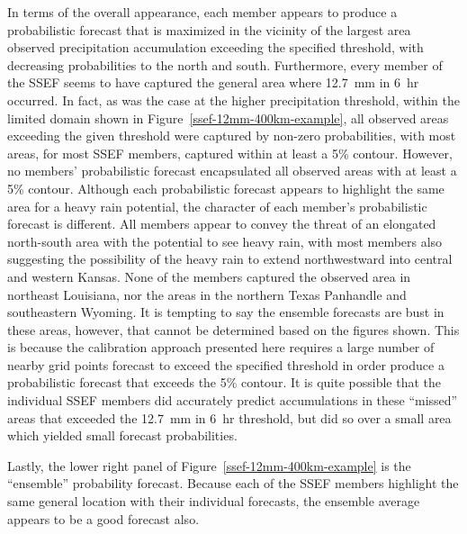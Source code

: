 In terms of the overall appearance, each member appears to produce a probabilistic forecast that is maximized in the vicinity of the largest area observed precipitation accumulation exceeding the specified threshold, with decreasing probabilities to the north and south.
Furthermore, every member of the SSEF seems to have captured the general area where \mbox{12.7 mm} in \mbox{6 hr} occurred.
In fact, as was the case at the higher precipitation threshold, within the limited domain shown in \mbox{Figure \ref{ssef-12mm-400km-example}}, all observed areas exceeding the given threshold were captured by non-zero probabilities, with most areas, for most SSEF members, captured within at least a 5\% contour.
However, no members' probabilistic forecast encapsulated all observed areas with at least a 5\% contour.
Although each probabilistic forecast appears to highlight the same area for a heavy rain potential, the character of each member's probabilistic forecast is different.
All members appear to convey the threat of an elongated north-south area with the potential to see heavy rain, with most members also suggesting the possibility of the heavy rain to extend northwestward into central and western Kansas.
None of the members captured the observed area in northeast Louisiana, nor the areas in the northern Texas Panhandle and southeastern Wyoming.
It is tempting to say the ensemble forecasts are bust in these areas, however, that cannot be determined based on the figures shown.
This is because the calibration approach presented here requires a large number of nearby grid points forecast to exceed the specified threshold in order produce a probabilistic forecast that exceeds the 5\% contour.
It is quite possible that the individual SSEF members did accurately predict accumulations in these ``missed'' areas that exceeded the \mbox{12.7 mm} in \mbox{6 hr} threshold, but did so over a small area which yielded small forecast probabilities.


Lastly, the lower right panel of \mbox{Figure \ref{ssef-12mm-400km-example}} is the ``ensemble'' probability forecast.
Because each of the SSEF members highlight the same general location with their individual forecasts, the ensemble average appears to be a good forecast also.



